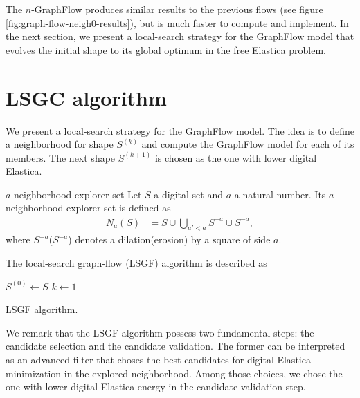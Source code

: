 The $n$-GraphFlow produces similar results to the previous flows (see figure \ref{fig:graph-flow-neigh0-results}), but is much faster to compute and implement. In the next section, we present a local-search strategy for the GraphFlow model that evolves the initial shape to its global optimum in the free Elastica problem.

\section{LSGC algorithm}
	We present a local-search strategy for the GraphFlow model. The idea is to define a neighborhood for shape $S^{(k)}$ and compute the GraphFlow model for each of its members. The next shape $S^{(k+1)}$ is chosen as the one with lower digital Elastica.


\begin{definition}{$a$-neighborhood explorer set}
	Let $S$ a digital set and $a$ a natural number. Its $a$-neighborhood explorer set is defined as
	\begin{align*}
		N_a(S) &= S \cup \bigcup_{a' < a}{S^{+a} \cup S^{-a}},
	\end{align*}
	where $S^{+a}$($S^{-a}$) denotes a dilation(erosion) by a square of side $a$.
\end{definition}

The local-search graph-flow (LSGF) algorithm is described as


\begin{algorithm}
 
 \BlankLine
 $S^{(0)} \longleftarrow S$\;
 $k \longleftarrow 1$\;
 \caption{LSGF algorithm.}
 \label{alg:legc-algorithm}  
\end{algorithm}

We remark that the LSGF algorithm possess two fundamental steps: the candidate selection and the candidate validation. The former can be interpreted as an advanced filter that choses the best candidates for digital Elastica minimization in the explored neighborhood. Among those choices, we chose the one with lower digital Elastica energy in the candidate validation step.

